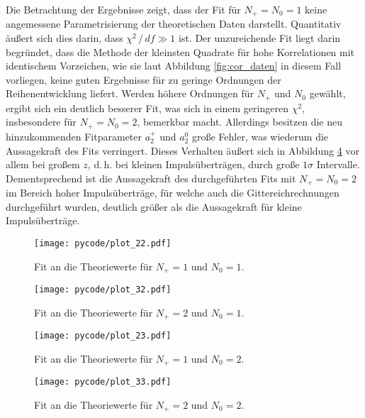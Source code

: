 Die Betrachtung der Ergebnisse zeigt, dass der Fit für $N_+ = N_0 = \num{1}$ keine angemessene Parametrisierung der theoretischen Daten darstellt.
Quantitativ äußert sich dies darin, dass $\chi^2 \,/\, df \gg \num{1}$ ist.
Der unzureichende Fit liegt darin begründet, dass die Methode der kleinsten Quadrate für hohe Korrelationen mit identischem Vorzeichen, wie sie laut Abbildung \ref{fig:cor_daten} in diesem Fall vorliegen, keine guten Ergebnisse für zu geringe Ordnungen der Reihenentwicklung liefert.
Werden höhere Ordnungen für $N_+$ und $N_0$ gewählt, ergibt sich ein deutlich besserer Fit, was sich in einem geringeren $\chi^2$, insbesondere für $N_+=N_0=\num{2}$, bemerkbar macht.
Allerdings besitzen die neu hinzukommenden Fitparameter $a_2^+$ und $a_2^0$ große Fehler, was wiederum die Aussagekraft des Fits verringert.
Dieses Verhalten äußert sich in Abbildung \ref{fig:fit33} vor allem bei großem $z$, d.\,h. bei kleinen Impulsüberträgen, durch große $\num{1}\sigma$ Intervalle.
Dementsprechend ist die Aussagekraft des durchgeführten Fits mit $N_+=N_0=\num{2}$ im Bereich hoher Impulsüberträge, für welche auch die Gittereichrechnungen durchgeführt wurden, deutlich größer als die Aussagekraft für kleine Impulsüberträge.

\begin{figure}
  \centering
  \texttt{[image: pycode/plot\_22.pdf]}
  \caption{Fit an die Theoriewerte für $N_+ = \num{1}$ und $N_0 = \num{1}$.}
  \label{fig:fit22}
\end{figure}
\begin{figure}
  \centering
  \texttt{[image: pycode/plot\_32.pdf]}
  \caption{Fit an die Theoriewerte für $N_+ = \num{2}$ und $N_0 = \num{1}$.}
  \label{fig:fit32}
\end{figure}
\begin{figure}
  \centering
  \texttt{[image: pycode/plot\_23.pdf]}
  \caption{Fit an die Theoriewerte für $N_+ = \num{1}$ und $N_0 = \num{2}$.}
  \label{fig:fit23}
\end{figure}
\begin{figure}
  \centering
  \texttt{[image: pycode/plot\_33.pdf]}
  \caption{Fit an die Theoriewerte für $N_+ = \num{2}$ und $N_0 = \num{2}$.}
  \label{fig:fit33}
\end{figure}

